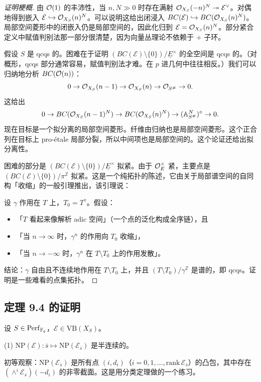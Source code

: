 
\begin{proof}[证明梗概]
由 $\mathcal{O}(1)$ 的丰沛性，当 $n,N\gg0$ 时存在满射 $\mathcal{O}_{X_S}(-n)^N\twoheadrightarrow\mathcal{E}^\vee$。对偶地得到嵌入 $\mathcal{E}\hookrightarrow\mathcal{O}_{X_S}(n)^N$。可以说明这给出闭浸入 $BC(\mathcal{E})\hookrightarrow BC(\mathcal{O}_{X_S}(n)^N)$。局部空间菱形中的闭嵌入仍是局部空间的，因此化归到 $\mathcal{E}=\mathcal{O}_{X_S}(n)^N$。部分紧合定义中赋值判别法那一部分很清楚，因为向量丛理论不依赖于 $+$ 子环。

假设 $S$ 是 qcqs 的。困难在于证明 $(BC(\mathcal{E})\setminus\{0\})/\underline{E}^\times$ 的全空间是 qcqs 的。（对概形，qcqs 部分通常容易，赋值判别法才难。在 $p$ 进几何中往往相反。）我们可以归纳地分析 $BC(\mathcal{O}(n))$：
\[
0\to\mathcal{O}_{X_S}(n-1)\to\mathcal{O}_{X_S}(n)\to\mathcal{O}_{S^\#}\to0.
\]
这给出
\[
0\to BC(\mathcal{O}_{X_S}(n-1)^N)\to BC(\mathcal{O}_{X_S}(n)^N)\to(\mathbb{A}^N_{S^\#})^\diamond\to0.
\]
现在目标是一个拟分离的局部空间菱形。纤维由归纳也是局部空间菱形。这个正合列在目标上 pro-étale 局部分裂，所以中间项也是局部空间的。这个论证还给出拟分离性。

困难的部分是 $(BC(\mathcal{E})\setminus\{0\})/\underline{E}^\times$ 拟紧。由于 $\mathcal{O}_E^\times$ 紧，主要点是 $(BC(\mathcal{E})\setminus\{0\})/\pi^{\mathbb{Z}}$ 拟紧。这是一个纯拓扑的陈述，它由关于局部谱空间的自同构「收缩」的一般引理推出，该引理说：

设 $\gamma$ 作用在 $T$ 上，$T_0=T^\gamma$。假设：
\begin{itemize}
  \item 「$T$ 看起来像解析 adic 空间」（一个点的泛化构成全序链），且
  \item 「当 $n\to\infty$ 时，$\gamma^n$ 的作用向 $T_0$ 收缩」，
  \item 「当 $n\to-\infty$ 时，$\gamma^n$ 在 $T\setminus T_0$ 上的作用发散」。
\end{itemize}
结论：$\gamma$ 自由且不连续地作用在 $T\setminus T_0$ 上，并且 $(T\setminus T_0)/\gamma^{\mathbb{Z}}$ 是谱的，即 qcqs。证明是一些难看的点集拓扑。
\end{proof}

\subsection{定理 9.4 的证明}

设 $S\in\mathrm{Perf}_{\mathbb{F}_q}$，$\mathcal{E}\in\mathrm{VB}(X_S)$。

(1) $\mathrm{NP}(\mathcal{E})\colon\bar{s}\mapsto\mathrm{NP}(\mathcal{E}_{\bar{s}})$ 是半连续的。

初等观察：$\mathrm{NP}(\mathcal{E}_{\bar{s}})$ 是所有点 $(i,d_i)$（$i=0,1,\dots,\mathrm{rank}\,\mathcal{E}_{\bar{s}}$）的凸包，其中存在 $(\wedge^i\mathcal{E}_{\bar{s}})(-d_i)$ 的非零截面。这是用分类定理做的一个练习。

